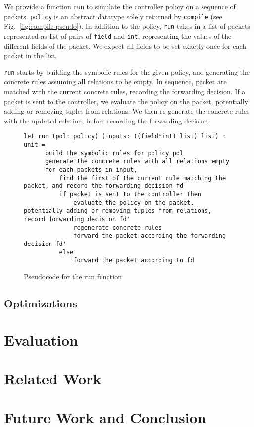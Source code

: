 \documentclass[preprint]{sigplanconf}
\begin{document}
We provide a function \lstinline|run| to simulate the controller policy on a sequence of packets. \lstinline|policy| is an abstract datatype solely returned by \lstinline|compile| (see Fig.~\ref{fig:compile-pseudo}). In addition to the policy, \lstinline|run| takes in a list of packets represented as list of pairs of \lstinline|field| and \lstinline|int|, representing the values of the different fields of the packet. We expect all fields to be set exactly once for each packet in the list.

\lstinline|run| starts by building the symbolic rules for the given policy, and generating the concrete rules assuming all relations to be empty. In sequence, packet are matched with the current concrete rules, recording the forwarding decision. If a packet is sent to the controller, we evaluate the policy on the packet, potentially adding or removing tuples from relations. We then re-generate the concrete rules with the updated relation, before recording the forwarding decision.

\begin{figure}[ht]
\begin{lstlisting}
let run (pol: policy) (inputs: ((field*int) list) list) : unit =
      build the symbolic rules for policy pol
      generate the concrete rules with all relations empty
      for each packets in input,
          find the first of the current rule matching the packet, and record the forwarding decision fd
          if packet is sent to the controller then
              evaluate the policy on the packet, potentially adding or removing tuples from relations, record forwarding decision fd'
              regenerate concrete rules
              forward the packet according the forwarding decision fd'
          else
              forward the packet according to fd 
\end{lstlisting}

\caption{Pseudocode for the run function}
\label{fig:run-pseudo}
  \end{figure}



\subsection*{Optimizations}


\section*{Evaluation}


\section*{Related Work}


\section*{Future Work and Conclusion}




\end{document}
